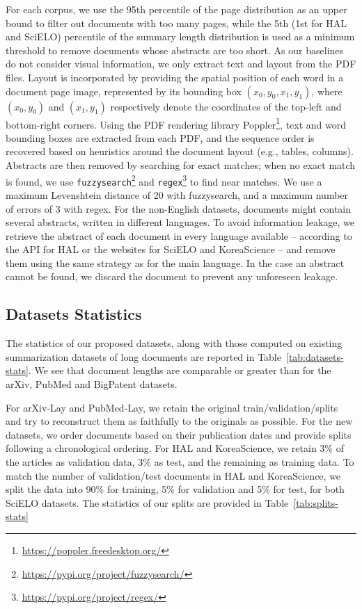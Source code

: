 For each corpus, we use the 95th percentile of the page distribution as an upper bound to filter out documents with too many pages, while the 5th (1st for HAL and SciELO) percentile of the summary length distribution is used as a minimum threshold to remove documents whose abstracts are too short. As our baselines do not consider visual information, we only extract text and layout from the PDF files. Layout is incorporated by providing the spatial position of each word in a document page image, represented by its bounding box $(x_0, y_0, x_1, y_1)$, where $(x_0, y_0)$ and $(x_1, y_1)$ respectively denote the coordinates of the top-left and bottom-right corners. Using the PDF rendering library Poppler\footnote{ \url{https://poppler.freedesktop.org/}}, text and word bounding boxes are extracted from each PDF, and the sequence order is recovered based on heuristics around the document layout (e.g., tables, columns). Abstracts are then removed by searching for exact matches; when no exact match is found, we use \texttt{fuzzysearch}\footnote{ \url{https://pypi.org/project/fuzzysearch/}} and \texttt{regex}\footnote{ \url{https://pypi.org/project/regex/}} to find near matches. We use a maximum Levenshtein distance of 20 with fuzzysearch, and a maximum number of errors of 3 with regex. For the non-English datasets, documents might contain several abstracts, written in different languages. To avoid information leakage, we retrieve the abstract of each document in every language available -- according to the API for HAL or the websites for SciELO and KoreaScience -- and remove them using the same strategy as for the main language. In the case an abstract cannot be found, we discard the document to prevent any unforeseen leakage. 

\subsection{Datasets Statistics}

The statistics of our proposed datasets, along with those computed on existing summarization datasets of long documents \citep{cohan2018discourse, sharma2019bigpatent} are reported in Table~\ref{tab:datasets-stats}. We see that document lengths are comparable or greater than for the arXiv, PubMed and BigPatent datasets.  

For arXiv-Lay and PubMed-Lay, we retain the original train/validation/splits and try to reconstruct them as faithfully to the originals as possible. For the new datasets, we order documents based on their publication dates and provide splits following a chronological ordering. For HAL and KoreaScience, we retain 3\% of the articles as validation data, 3\% as test, and the remaining as training data. To match the number of validation/test documents in HAL and KoreaScience, we split the data into 90\% for training, 5\% for validation and 5\% for test, for both SciELO datasets. The statistics of our splits are provided in Table~\ref{tab:splits-stats}

